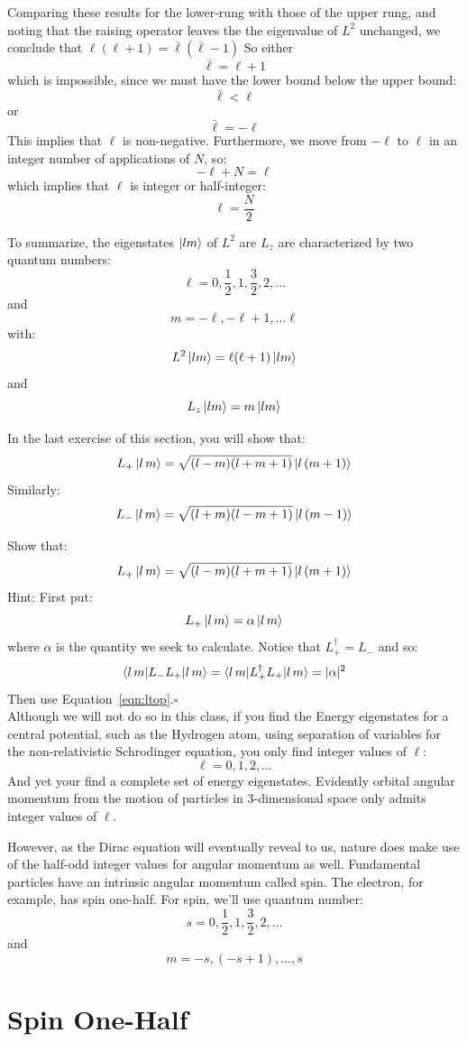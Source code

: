 \documentclass[12pt]{article}
\begin{document}
Comparing these results for the lower-rung with those of the upper rung, and noting that the raising operator leaves the the eigenvalue of $L^2$ unchanged, we conclude that
$\ell(\ell+1) = \bar{\ell}(\bar{\ell}-1)$
So either
$$\bar{\ell} = \ell+1$$
which is impossible, since we must have the lower bound below the upper bound:
$$\bar{\ell} < \ell $$
or
$$\bar{\ell} = -\ell$$
This implies that $\ell$ is non-negative.  Furthermore, we move from $-\ell$ to $\ell$ in an integer number of applications of $N$, so:
$$-\ell + N = \ell$$
which implies that $\ell$ is integer or half-integer:
$$\ell = \frac{N}{2}$$

To summarize, the eigenstates $\ket{lm}$ of $L^2$ are $L_z$ are characterized by two quantum numbers:
$$\ell = 0, \frac{1}{2}, 1, \frac{3}{2}, 2, \ldots$$
and
$$m = -\ell, -\ell+1, \dots \ell$$
with:
$$L^2 \ket{lm} =  \ell (\ell+1) \ket{lm}$$
and
$$L_z \ket{lm} =  m \ket{lm}$$

In the last exercise of this section, you will show that:
$$L_+ \ket{l\,m} =  \sqrt{(l-m)(l+m+1)} \ket{l\,(m+1)}$$
Similarly:
$$L_- \ket{l\,m} =  \sqrt{(l+m)(l-m+1)} \ket{l\,(m-1)}$$

\exercise Show that:
$$L_+ \ket{l\,m} =  \sqrt{(l-m)(l+m+1)} \ket{l\,(m+1)}$$
Hint:  First put:
$$L_+ \ket{l\,m} = \alpha \ket{l\,m}$$
where $\alpha$ is the quantity we seek to calculate.  Notice that $L_+^\dagger = L_-$ and so:
$$\braket{l\,m|L_-L_+|l\,m} = \braket{l\,m|L_+^\dagger L_+|l\,m} = |\alpha|^2$$
Then use Equation~\ref{eqn:ltop}.$\square$\\

Although we will not do so in this class, if you find the Energy
eigenstates for a central potential, such as the Hydrogen atom, using
separation of variables for the non-relativistic Schrodinger equation,
you only find integer values of $\ell$:
$$\ell = 0, 1, 2, \ldots$$
And yet your find a complete set of energy eigenstates.  Evidently
orbital angular momentum from the motion of particles in 3-dimensional
space only admits integer values of $\ell$.

However, as the Dirac equation will eventually reveal to us, nature
does make use of the half-odd integer values for angular momentum as
well.  Fundamental particles have an intrinsic angular momentum called
spin.  The electron, for example, has spin one-half.  For spin, we'll use quantum number:
$$s = 0, \frac{1}{2}, 1, \frac{3}{2}, 2, \ldots$$
and
$$m = -s, (-s+1), \ldots, s$$

\section{Spin One-Half}
\end{document}
